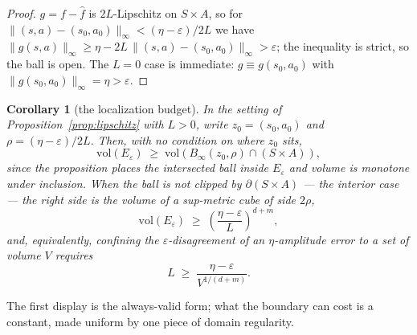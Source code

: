 \documentclass[11pt]{article}
\newtheorem{corollary}{Corollary}
\theoremstyle{definition}
\theoremstyle{remark}
\begin{document}
\begin{proof}
$g = f - \hat f$ is $2L$-Lipschitz on $S \times A$, so for $\|(s,a) - (s_0,a_0)\|_\infty < (\eta-\varepsilon)/2L$ we have $\|g(s,a)\|_\infty \geq \eta - 2L\,\|(s,a)-(s_0,a_0)\|_\infty > \varepsilon$; the inequality is strict, so the ball is open. The $L = 0$ case is immediate: $g \equiv g(s_0,a_0)$ with $\|g(s_0,a_0)\|_\infty = \eta > \varepsilon$.
\end{proof}

\begin{corollary}[the localization budget]
\label{cor:locbudget}
In the setting of Proposition~\ref{prop:lipschitz} with $L > 0$, write $z_0 = (s_0,a_0)$ and $\rho = (\eta-\varepsilon)/2L$. Then, with no condition on where $z_0$ sits,
\[
  \mathrm{vol}(E_\varepsilon) \;\geq\; \mathrm{vol}\!\left(B_\infty(z_0,\rho) \cap (S \times A)\right),
\]
since the proposition places the intersected ball inside $E_\varepsilon$ and volume is monotone under inclusion. When the ball is not clipped by $\partial(S \times A)$ --- the interior case --- the right side is the volume of a sup-metric cube of side $2\rho$,
\[
  \mathrm{vol}(E_\varepsilon) \;\geq\; \left(\frac{\eta-\varepsilon}{L}\right)^{d+m},
\]
and, equivalently, confining the $\varepsilon$-disagreement of an $\eta$-amplitude error to a set of volume $V$ requires
\[
  L \;\geq\; \frac{\eta-\varepsilon}{V^{1/(d+m)}} .
\]
\end{corollary}

The first display is the always-valid form; what the boundary can cost is a constant, made uniform by one piece of domain regularity.
\end{document}
